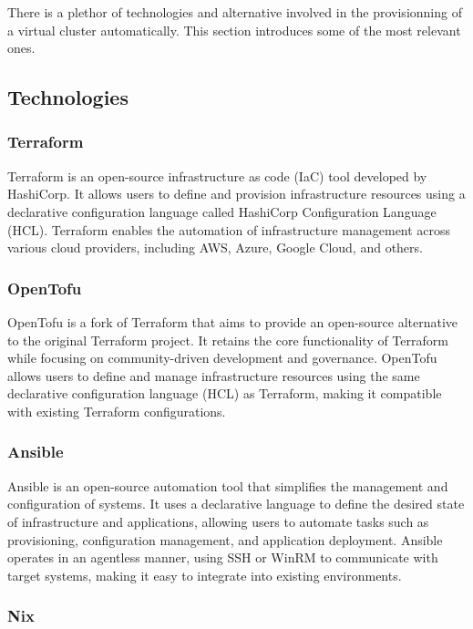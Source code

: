 There is a plethor of technologies and alternative involved in the provisionning of a virtual cluster automatically. This section introduces some of the most relevant ones.

\subsection{Technologies}
\label{sec:technologies}

\subsubsection{Terraform}
\label{sec:terraform}

Terraform is an open-source infrastructure as code (IaC) tool developed by HashiCorp. It allows users to define and provision infrastructure resources using a declarative configuration language called HashiCorp Configuration Language (HCL). Terraform enables the automation of infrastructure management across various cloud providers, including AWS, Azure, Google Cloud, and others.

\subsubsection{OpenTofu}
\label{sec:opentofu}
OpenTofu is a fork of Terraform that aims to provide an open-source alternative to the original Terraform project. It retains the core functionality of Terraform while focusing on community-driven development and governance. OpenTofu allows users to define and manage infrastructure resources using the same declarative configuration language (HCL) as Terraform, making it compatible with existing Terraform configurations.

\subsubsection{Ansible}
\label{sec:ansible}

Ansible is an open-source automation tool that simplifies the management and configuration of systems. It uses a declarative language to define the desired state of infrastructure and applications, allowing users to automate tasks such as provisioning, configuration management, and application deployment. Ansible operates in an agentless manner, using SSH or WinRM to communicate with target systems, making it easy to integrate into existing environments.

\subsubsection{Nix}
\label{sec:nix}


